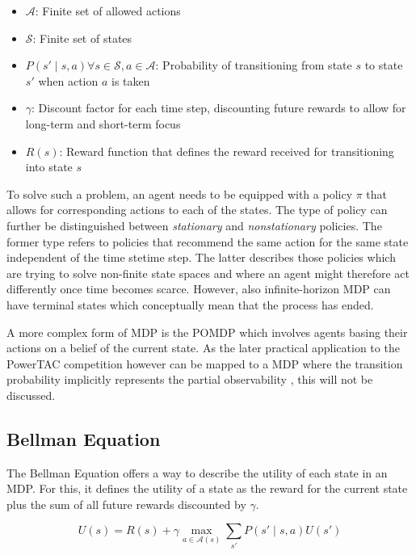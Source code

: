 \begin{itemize}
	\item $\mathcal{A}$: Finite set of allowed actions  
	\item $\mathcal{S}$: Finite set of states
	\item $P(s' \mid s,a) \forall s \in \mathcal{S}, a \in \mathcal{A}$: Probability of transitioning from state
	$s$ to state $s'$ when action $a$ is taken
	\item $\gamma$: Discount factor for each time step, discounting future rewards to allow for long-term and
		short-term focus
	\item $R(s)$: Reward function that defines the reward received for transitioning into state $s$
\end{itemize}

To solve such a problem, an agent needs to be equipped with a policy $\pi$ that allows for corresponding actions to each
of the states. The type of policy can further be distinguished between \emph{stationary} and \emph{nonstationary}
policies. The former type refers to policies that recommend the same action for the same state independent of the
time stetime step. The latter describes those policies which are trying to solve non-finite state spaces and where an
agent might therefore act differently once time becomes scarce. However, also infinite-horizon \ac {MDP} can have
terminal states which conceptually mean that the process has ended.

A more complex form of \ac {MDP} is the \ac {POMDP} which involves agents basing their actions on a belief of the
current state. As the later practical application to the \ac {PowerTAC} competition however can be mapped to a \ac {MDP}
where the transition probability implicitly represents the partial observability \citep{tactexurieli2016mdp}, this will not be discussed. 

\subsection{Bellman Equation}%
\label{ssub:bellman_equation}

The Bellman Equation offers a way to describe the utility of each state in an \ac {MDP}. For this, it defines the
utility of a state as the reward for the current state plus the sum of all future rewards discounted by $\gamma$. 

\[
U(s) = R(s) + \gamma \max_{a\in\mathcal{A}(s)} \sum_{s'}{P(s' \mid s,a)U(s')}
\]


